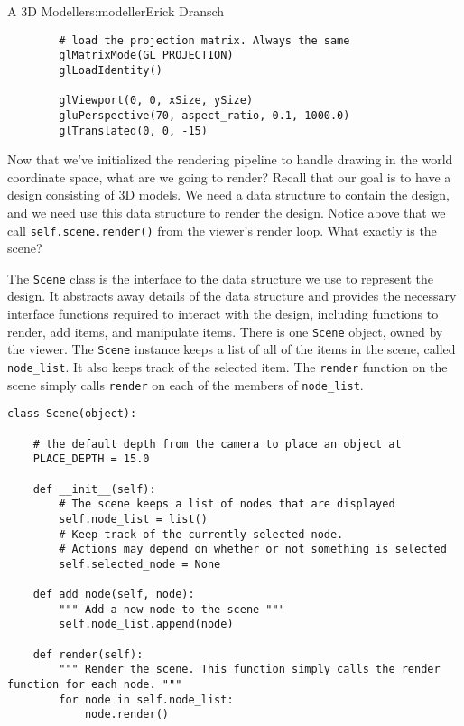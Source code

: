 \begin{aosachapter}{A 3D Modeller}{s:modeller}{Erick Dransch}
\begin{verbatim}
        # load the projection matrix. Always the same
        glMatrixMode(GL_PROJECTION)
        glLoadIdentity()

        glViewport(0, 0, xSize, ySize)
        gluPerspective(70, aspect_ratio, 0.1, 1000.0)
        glTranslated(0, 0, -15)
\end{verbatim}

\label{what-to-render-the-scene}

Now that we've initialized the rendering pipeline to handle drawing in
the world coordinate space, what are we going to render? Recall that our
goal is to have a design consisting of 3D models. We need a data
structure to contain the design, and we need use this data structure to
render the design. Notice above that we call
\texttt{self.scene.render()} from the viewer's render loop. What exactly
is the scene?

The \texttt{Scene} class is the interface to the data structure we use
to represent the design. It abstracts away details of the data structure
and provides the necessary interface functions required to interact with
the design, including functions to render, add items, and manipulate
items. There is one \texttt{Scene} object, owned by the viewer. The
\texttt{Scene} instance keeps a list of all of the items in the scene,
called \texttt{node\_list}. It also keeps track of the selected item.
The \texttt{render} function on the scene simply calls \texttt{render}
on each of the members of \texttt{node\_list}.

\begin{verbatim}
class Scene(object):

    # the default depth from the camera to place an object at
    PLACE_DEPTH = 15.0

    def __init__(self):
        # The scene keeps a list of nodes that are displayed
        self.node_list = list()
        # Keep track of the currently selected node.
        # Actions may depend on whether or not something is selected
        self.selected_node = None

    def add_node(self, node):
        """ Add a new node to the scene """
        self.node_list.append(node)

    def render(self):
        """ Render the scene. This function simply calls the render function for each node. """
        for node in self.node_list:
            node.render()
\end{verbatim}

\label{nodes}


\end{aosachapter}
